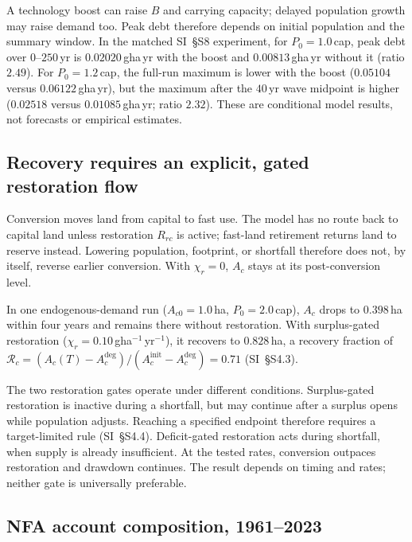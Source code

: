 \documentclass[preprint,12pt,authoryear]{elsarticle}
\begin{document}
A technology boost can raise $B$ and carrying capacity; delayed population growth may raise demand too. Peak debt therefore depends on initial population and the summary window. In the matched SI~\S S8 experiment, for $P_0=1.0$\,cap, peak debt over $0$--$250$\,yr is $0.02020$\,gha\,yr with the boost and $0.00813$\,gha\,yr without it (ratio $2.49$). For $P_0=1.2$\,cap, the full-run maximum is lower with the boost ($0.05104$ versus $0.06122$\,gha\,yr), but the maximum after the $40$\,yr wave midpoint is higher ($0.02518$ versus $0.01085$\,gha\,yr; ratio $2.32$). These are conditional model results, not forecasts or empirical estimates.

\subsection{Recovery requires an explicit, gated restoration flow}\label{sec:recovery}

Conversion moves land from capital to fast use. The model has no route back to capital land unless restoration $R_{rc}$ is active; fast-land retirement returns land to reserve instead. Lowering population, footprint, or shortfall therefore does not, by itself, reverse earlier conversion. With $\chi_r=0$, $A_c$ stays at its post-conversion level.

In one endogenous-demand run ($A_{c0}=1.0$\,ha, $P_0=2.0$\,cap), $A_c$ drops to $0.398$\,ha within four years and remains there without restoration. With surplus-gated restoration ($\chi_r=0.10$\,gha$^{-1}$\,yr$^{-1}$), it recovers to $0.828$\,ha, a recovery fraction of $\mathcal R_c=(A_c(T)-A_c^{\mathrm{deg}})/(A_c^{\mathrm{init}}-A_c^{\mathrm{deg}})=0.71$ (SI~\S S4.3).

The two restoration gates operate under different conditions. Surplus-gated restoration is inactive during a shortfall, but may continue after a surplus opens while population adjusts. Reaching a specified endpoint therefore requires a target-limited rule (SI~\S S4.4). Deficit-gated restoration acts during shortfall, when supply is already insufficient. At the tested rates, conversion outpaces restoration and drawdown continues. The result depends on timing and rates; neither gate is universally preferable.

\subsection{NFA account composition, 1961--2023}\label{sec:empirical}
\end{document}
